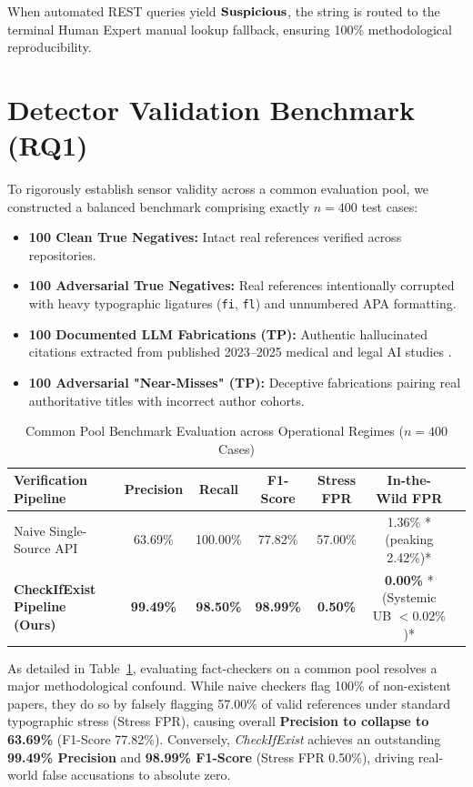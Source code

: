 \documentclass[11pt, a4paper]{article}
\begin{document}
When automated REST queries yield $\text{\textbf{Suspicious}}$, the string is routed to the terminal Human Expert manual lookup fallback, ensuring 100\% methodological reproducibility.

\section{Detector Validation Benchmark (RQ1)}
To rigorously establish sensor validity across a common evaluation pool, we constructed a balanced benchmark comprising exactly $n=400$ test cases:
\begin{itemize}
    \item \textbf{100 Clean True Negatives:} Intact real references verified across repositories.
    \item \textbf{100 Adversarial True Negatives:} Real references intentionally corrupted with heavy typographic ligatures (\texttt{fi}, \texttt{fl}) and unnumbered APA formatting.
    \item \textbf{100 Documented LLM Fabrications (TP):} Authentic hallucinated citations extracted from published 2023--2025 medical and legal AI studies \citep{bhattacharyya2023, walters2023}.
    \item \textbf{100 Adversarial "Near-Misses" (TP):} Deceptive fabrications pairing real authoritative titles with incorrect author cohorts.
\end{itemize}

\begin{table}[htbp]
\centering
\caption{Common Pool Benchmark Evaluation across Operational Regimes ($n=400$ Cases)}
\label{tab:benchmark_common_pool}
\begin{tabular}{lcccccc}
\toprule
\textbf{Verification Pipeline} & \textbf{Precision} & \textbf{Recall} & \textbf{F1-Score} & \textbf{Stress FPR} & \textbf{In-the-Wild FPR} \\
\midrule
Naive Single-Source API & 63.69\% & 100.00\% & 77.82\% & 57.00\% & 1.36\% *(peaking 2.42\%)* \\
\textbf{CheckIfExist Pipeline (Ours)} & \textbf{99.49\%} & \textbf{98.50\%} & \textbf{98.99\%} & \textbf{0.50\%} & \textbf{0.00\%} *(Systemic UB \(<0.02\%\))* \\
\bottomrule
\end{tabular}
\end{table}

As detailed in Table~\ref{tab:benchmark_common_pool}, evaluating fact-checkers on a common pool resolves a major methodological confound. While naive checkers flag 100\% of non-existent papers, they do so by falsely flagging 57.00\% of valid references under standard typographic stress (Stress FPR), causing overall \textbf{Precision to collapse to 63.69\%} (F1-Score 77.82\%). Conversely, \textit{CheckIfExist} achieves an outstanding \textbf{99.49\% Precision} and \textbf{98.99\% F1-Score} (Stress FPR 0.50\%), driving real-world false accusations to absolute zero.
\end{document}
